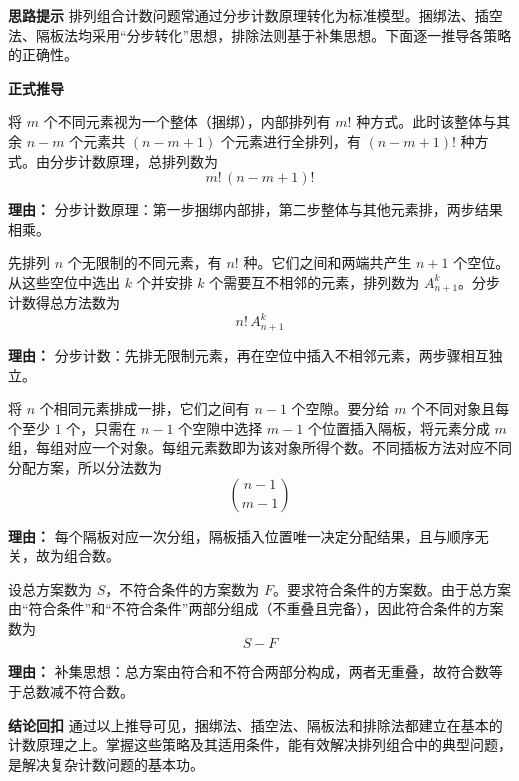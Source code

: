 \begin{proofbox}
	\textbf{\textcolor{CProof}{思路提示}}
	排列组合计数问题常通过分步计数原理转化为标准模型。捆绑法、插空法、隔板法均采用“分步转化”思想，排除法则基于补集思想。下面逐一推导各策略的正确性。

	\medskip
	\textbf{\textcolor{CProof}{正式推导}}
	\begin{description}[style=nextline, leftmargin=2.8em, labelsep=0.5em, itemsep=0.55em]
		\item[\textbf{步骤一（捆绑法）：}]
			将 $m$ 个不同元素视为一个整体（捆绑），内部排列有 $m!$ 种方式。此时该整体与其余 $n-m$ 个元素共 $(n-m+1)$ 个元素进行全排列，有 $(n-m+1)!$ 种方式。由分步计数原理，总排列数为
			\[
				m!\,(n-m+1)!
			\]
			\par \textbf{理由：} 分步计数原理：第一步捆绑内部排，第二步整体与其他元素排，两步结果相乘。
		\item[\textbf{步骤二（插空法）：}]
			先排列 $n$ 个无限制的不同元素，有 $n!$ 种。它们之间和两端共产生 $n+1$ 个空位。从这些空位中选出 $k$ 个并安排 $k$ 个需要互不相邻的元素，排列数为 $A_{n+1}^{k}$。分步计数得总方法数为
			\[
				n!\,A_{n+1}^{k}
			\]
			\par \textbf{理由：} 分步计数：先排无限制元素，再在空位中插入不相邻元素，两步骤相互独立。
		\item[\textbf{步骤三（隔板法）：}]
			将 $n$ 个相同元素排成一排，它们之间有 $n-1$ 个空隙。要分给 $m$ 个不同对象且每个至少 $1$ 个，只需在 $n-1$ 个空隙中选择 $m-1$ 个位置插入隔板，将元素分成 $m$ 组，每组对应一个对象。每组元素数即为该对象所得个数。不同插板方法对应不同分配方案，所以分法数为
			\[
				\binom{n-1}{m-1}
			\]
			\par \textbf{理由：} 每个隔板对应一次分组，隔板插入位置唯一决定分配结果，且与顺序无关，故为组合数。
		\item[\textbf{步骤四（排除法）：}]
			设总方案数为 $S$，不符合条件的方案数为 $F$。要求符合条件的方案数。由于总方案由“符合条件”和“不符合条件”两部分组成（不重叠且完备），因此符合条件的方案数为
			\[
				S - F
			\]
			\par \textbf{理由：} 补集思想：总方案由符合和不符合两部分构成，两者无重叠，故符合数等于总数减不符合数。
	\end{description}

	\medskip
	\textbf{\textcolor{CProof}{结论回扣}}
	通过以上推导可见，捆绑法、插空法、隔板法和排除法都建立在基本的计数原理之上。掌握这些策略及其适用条件，能有效解决排列组合中的典型问题，是解决复杂计数问题的基本功。
\end{proofbox}
